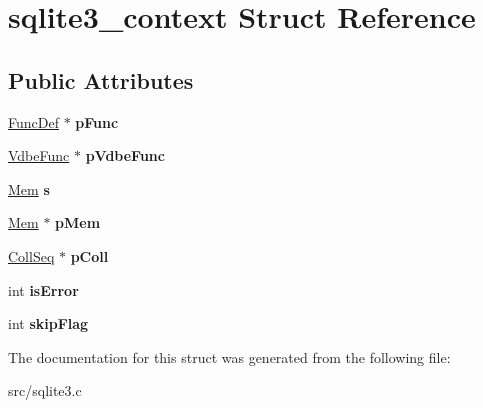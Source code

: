 \hypertarget{structsqlite3__context}{\section{sqlite3\-\_\-context Struct Reference}
\label{structsqlite3__context}
}
\subsection*{Public Attributes}
\begin{DoxyCompactItemize}
\item 
\hypertarget{structsqlite3__context_af4215c87be2c0cb10868f623a552a2aa}{\hyperlink{struct_func_def}{Func\-Def} $\ast$ {\bfseries p\-Func}}\label{structsqlite3__context_af4215c87be2c0cb10868f623a552a2aa}

\item 
\hypertarget{structsqlite3__context_af35405f4f62cfc0b81bb2eb6c82b2363}{\hyperlink{struct_vdbe_func}{Vdbe\-Func} $\ast$ {\bfseries p\-Vdbe\-Func}}\label{structsqlite3__context_af35405f4f62cfc0b81bb2eb6c82b2363}

\item 
\hypertarget{structsqlite3__context_a53d44518a1f7f57ce5a2d73b6e8d2c14}{\hyperlink{struct_mem}{Mem} {\bfseries s}}\label{structsqlite3__context_a53d44518a1f7f57ce5a2d73b6e8d2c14}

\item 
\hypertarget{structsqlite3__context_a7b84aa5920329cb0eb943832175b48b5}{\hyperlink{struct_mem}{Mem} $\ast$ {\bfseries p\-Mem}}\label{structsqlite3__context_a7b84aa5920329cb0eb943832175b48b5}

\item 
\hypertarget{structsqlite3__context_a4e4b12fb65814515fdb967559693f816}{\hyperlink{struct_coll_seq}{Coll\-Seq} $\ast$ {\bfseries p\-Coll}}\label{structsqlite3__context_a4e4b12fb65814515fdb967559693f816}

\item 
\hypertarget{structsqlite3__context_ae4351b8da8c6d2676074612c1b8d4af5}{int {\bfseries is\-Error}}\label{structsqlite3__context_ae4351b8da8c6d2676074612c1b8d4af5}

\item 
\hypertarget{structsqlite3__context_aaee18da17fe31959469aa1ca9b9e1406}{int {\bfseries skip\-Flag}}\label{structsqlite3__context_aaee18da17fe31959469aa1ca9b9e1406}

\end{DoxyCompactItemize}


The documentation for this struct was generated from the following file\-:\begin{DoxyCompactItemize}
\item 
src/sqlite3.\-c\end{DoxyCompactItemize}
